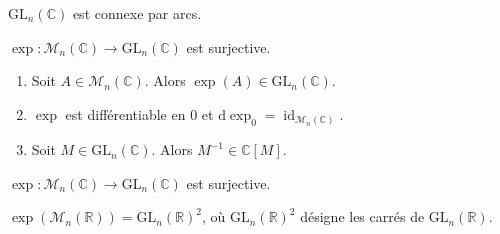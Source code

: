 
	\begin{proposition}
		$\mathrm{GL}_n(\mathbb{C})$ est connexe par arcs.
	\end{proposition}

	\begin{application}
		$\exp : \mathcal{M}_n(\mathbb{C}) \rightarrow \mathrm{GL}_n(\mathbb{C})$ est surjective.
	\end{application}


    \begin{lemma}
      \begin{enumerate}[label=(\roman*)]
        \item Soit $A \in \mathcal{M}_n(\mathbb{C})$. Alors $\exp(A) \in \mathrm{GL}_n(\mathbb{C})$.
        \item $\exp$ est différentiable en $0$ et $\mathrm{d}\exp_0 = \operatorname{id}_{\mathcal{M}_n(\mathbb{C})}$.
        \item Soit $M \in \mathrm{GL}_n(\mathbb{C})$. Alors $M^{-1} \in \mathbb{C}[M]$.
      \end{enumerate}
    \end{lemma}


    \begin{theorem}
      $\exp : \mathcal{M}_n(\mathbb{C}) \rightarrow \mathrm{GL}_n(\mathbb{C})$ est surjective.
    \end{theorem}

    \begin{application}
      $\exp(\mathcal{M}_n(\mathbb{R})) = \mathrm{GL}_n(\mathbb{R})^2$, où $\mathrm{GL}_n(\mathbb{R})^2$ désigne les carrés de $\mathrm{GL}_n(\mathbb{R})$.
    \end{application}

